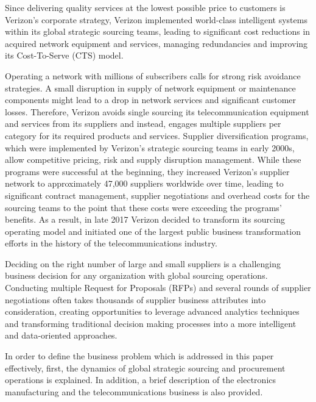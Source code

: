 \documentclass[inte,nonblindrev]{informs3} %
\begin{document}
Since delivering quality services at the lowest possible price to customers is Verizon's corporate strategy, Verizon implemented world-class intelligent systems within its global strategic sourcing teams, leading to significant cost reductions in acquired network equipment and services, managing redundancies and improving its Cost-To-Serve (CTS) model.

Operating a network with millions of subscribers calls for strong risk avoidance strategies. A small disruption in supply of network equipment or maintenance components might lead to a drop in network services and significant customer losses. Therefore, Verizon avoids single sourcing its telecommunication equipment and services from its suppliers and instead, engages multiple suppliers per category for its required products and services. Supplier diversification programs, which were implemented by Verizon's strategic sourcing teams in early 2000s, allow competitive pricing, risk and supply disruption management. While these programs were successful at the beginning, they increased Verizon's supplier network to approximately 47,000 suppliers worldwide over time, leading to significant contract management, supplier negotiations and overhead costs for the sourcing teams to the point that these costs were exceeding the programs' benefits. As a result, in late 2017 Verizon decided to transform its sourcing operating model and initiated one of the largest public business transformation efforts in the history of the telecommunications industry.

Deciding on the right number of large and small suppliers is a challenging business decision for any organization with global sourcing operations. Conducting multiple Request for Proposals (RFPs) and several rounds of supplier negotiations often takes thousands of supplier business attributes into consideration, creating opportunities to leverage advanced analytics techniques and transforming traditional decision making processes into a more intelligent and data-oriented approaches. 

In order to define the business problem which is addressed in this paper effectively, first, the dynamics of global strategic sourcing and procurement operations is explained. In addition, a brief description of the electronics manufacturing and the telecommunications business is also provided.
\end{document}
